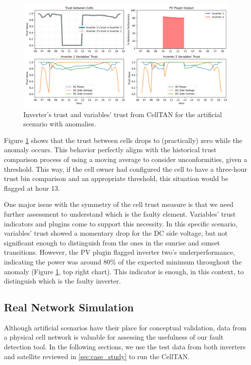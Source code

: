 \begin{figure}[h!]
    \centering
    \includegraphics[width=\textwidth]{figures/chapter5/results/artificial/43_results_test_clone_02-1.png}
    \caption{Inverter's trust and variables' trust from CellTAN for the artificial scenario with anomalies.}
    \label{fig:artificial_results_02}
\end{figure}

Figure \ref{fig:artificial_results_02} shows that the trust between cells drops to (practically) zero while the anomaly occurs. This behavior perfectly aligns with the historical trust comparison process of using a moving average to consider unconformities, given a threshold. This way, if the cell owner had configured the cell to have a three-hour trust bin comparison and an appropriate threshold, this situation would be flagged at hour 13.

One major issue with the symmetry of the cell trust measure is that we need further assessment to understand which is the faulty element. Variables' trust indicators and plugins come to support this necessity. In this specific scenario, variables' trust showed a momentary drop for the DC side voltage, but not significant enough to distinguish from the ones in the sunrise and sunset transitions. However, the PV plugin flagged inverter two's underperformance, indicating the power was around 80\% of the expected minimum throughout the anomaly (Figure \ref{fig:artificial_results_02}, top right chart). This indicator is enough, in this context, to distinguish which is the faulty inverter.

\subsection{Real Network Simulation}

Although artificial scenarios have their place for conceptual validation, data from a physical cell network is valuable for assessing the usefulness of our fault detection tool. In the following sections, we use the test data from both inverters and satellite reviewed in \ref{sec:case_study} to run the CellTAN.

